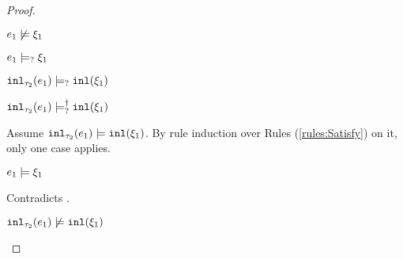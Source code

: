\begin{proof}
\begin{byCases}
\begin{byCases}
\begin{byCases}
        \item[\cmaysatisfy{e_1}{\xi_1}]
            \begin{pfsteps*}
            \item $e_1 \not\models \xi_1$  
            \item $e_1 \models_{?} \xi_1$  
            \item $\mathtt{inl}_{\tau_2}({e_1}) \models_{?} \mathtt{inl}(\xi_1)$  
            \item $\mathtt{inl}_{\tau_2}({e_1}) \models_{?}^{\dag} \mathtt{inl}(\xi_1)$ 
            \end{pfsteps*}
            Assume $\mathtt{inl}_{\tau_2}({e_1}) \models \mathtt{inl}(\xi_1)$. By rule induction over Rules (\ref{rules:Satisfy}) on it, only one case applies.
            \begin{byCases}
            \item[\text{(\ref{rule:CSInl})}]
                \begin{pfsteps*}
                \item $e_1 \models \xi_1$
                \end{pfsteps*}
                Contradicts .
            \end{byCases}
            \begin{pfsteps*}
            \item $\mathtt{inl}_{\tau_2}({e_1}) \not\models \mathtt{inl}(\xi_1)$ 
            \end{pfsteps*}
           

\end{byCases}
\end{byCases}
\end{byCases}
\end{proof}
